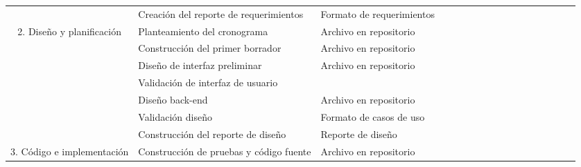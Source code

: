 \begin{table}[H]
\begin{adjustbox}{width={\textwidth},totalheight={\textheight},keepaspectratio}
\begin{tabular}{cp{10.555em}p{10.555em}rrrrrrrrrrrrrr}
    \cline{2-3}  & Creación del reporte de requerimientos & Formato de requerimientos &   &   &   &   &   & \cellcolor[rgb]{ .557,  .663,  .859} & \cellcolor[rgb]{ .557,  .663,  .859} &   &   &   &   &   &   &  \bigstrut\\
    \cline{1-3}\multicolumn{1}{c}{\multirow{7}[14]{*}{2. Diseño y planificación}} & Planteamiento del cronograma & Archivo en repositorio &   &   &   &   & \cellcolor[rgb]{ 1,  .851,  .4} &   &   & \cellcolor[rgb]{ 1,  .851,  .4} &   &   &   &   &   &  \bigstrut\\
    \cline{2-3}  & Construcción del primer borrador & Archivo en repositorio &   &   & \cellcolor[rgb]{ 1,  .949,  .8} & \cellcolor[rgb]{ 1,  .949,  .8} &   &   &   &   &   &   &   &   &   &  \bigstrut\\
    \cline{2-3}  & Diseño de interfaz preliminar & Archivo en repositorio &   &   &   & \cellcolor[rgb]{ 1,  .851,  .4} & \cellcolor[rgb]{ 1,  .851,  .4} & \cellcolor[rgb]{ 1,  .851,  .4} &   &   &   &   &   &   &   &  \bigstrut\\
    \cline{2-3}  & Validación de interfaz de usuario & \multicolumn{1}{r}{} &   &   &   &   & \cellcolor[rgb]{ 1,  .949,  .8} & \cellcolor[rgb]{ 1,  .949,  .8} &   &   &   &   &   &   &   &  \bigstrut\\
    \cline{2-3}  & Diseño back-end & Archivo en repositorio &   &   &   &   & \cellcolor[rgb]{ 1,  .851,  .4} & \cellcolor[rgb]{ 1,  .851,  .4} & \cellcolor[rgb]{ 1,  .851,  .4} & \cellcolor[rgb]{ 1,  .851,  .4} & \cellcolor[rgb]{ 1,  .851,  .4} & \cellcolor[rgb]{ 1,  .851,  .4} & \cellcolor[rgb]{ 1,  .851,  .4} & \cellcolor[rgb]{ 1,  .851,  .4} & \cellcolor[rgb]{ 1,  .851,  .4} & \cellcolor[rgb]{ 1,  .851,  .4} \bigstrut\\
    \cline{2-3}  & Validación diseño & Formato de casos de uso &   &   &   &   &   &   &   &   &   &   & \cellcolor[rgb]{ 1,  .949,  .8} & \cellcolor[rgb]{ 1,  .949,  .8} & \cellcolor[rgb]{ 1,  .949,  .8} & \cellcolor[rgb]{ 1,  .949,  .8} \bigstrut\\
    \cline{2-3}  & Construcción del reporte de diseño & Reporte de diseño &   &   &   &   &   &   &   &   &   &   & \cellcolor[rgb]{ 1,  .851,  .4} & \cellcolor[rgb]{ 1,  .851,  .4} & \cellcolor[rgb]{ 1,  .851,  .4} & \cellcolor[rgb]{ 1,  .851,  .4} \bigstrut\\
    \cline{1-3}\multicolumn{1}{c}{\multirow{2}[4]{*}{3. Código e implementación}} & Construcción de pruebas y código fuente & Archivo en repositorio &   &   &   &   &   & \cellcolor[rgb]{ .663,  .816,  .557} & \cellcolor[rgb]{ .663,  .816,  .557} & \cellcolor[rgb]{ .663,  .816,  .557} & \cellcolor[rgb]{ .663,  .816,  .557} & \cellcolor[rgb]{ .663,  .816,  .557} & \cellcolor[rgb]{ .663,  .816,  .557} & \cellcolor[rgb]{ .663,  .816,  .557} & \cellcolor[rgb]{ .663,  .816,  .557} & \cellcolor[rgb]{ .663,  .816,  .557} \bigstrut\\

\end{tabular}
\end{adjustbox}
\end{table}
